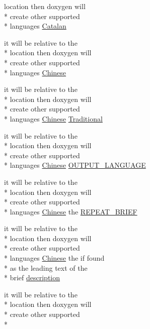 \begin{DoxyCompactItemize}
location then doxygen will \\*
create other supported \\*
languages \hyperlink{mkdoc_8dox_ab887b26d09c2ec0872c1e14e2f928a64}{Catalan}
\item 
it will be relative to the \\*
location then doxygen will \\*
create other supported \\*
languages \hyperlink{mkdoc_8dox_ab6ff97d2e5e9fa61c208d5f0eee91c62}{Chinese}
\item 
it will be relative to the \\*
location then doxygen will \\*
create other supported \\*
languages \hyperlink{mkdoc_8dox_ab6ff97d2e5e9fa61c208d5f0eee91c62}{Chinese} \hyperlink{mkdoc_8dox_ab1a4445cb897e49c113c5a2eff77118a}{Traditional}
\item 
it will be relative to the \\*
location then doxygen will \\*
create other supported \\*
languages \hyperlink{mkdoc_8dox_ab6ff97d2e5e9fa61c208d5f0eee91c62}{Chinese} \hyperlink{mkdoc_8dox_a70b2dc2bbbd06aad351734d9f602edd0}{O\-U\-T\-P\-U\-T\-\_\-\-L\-A\-N\-G\-U\-A\-G\-E}
\item 
it will be relative to the \\*
location then doxygen will \\*
create other supported \\*
languages \hyperlink{mkdoc_8dox_ab6ff97d2e5e9fa61c208d5f0eee91c62}{Chinese} the \hyperlink{mkdoc_8dox_a97488cf1b604b4e0594c9a044197735c}{R\-E\-P\-E\-A\-T\-\_\-\-B\-R\-I\-E\-F}
\item 
it will be relative to the \\*
location then doxygen will \\*
create other supported \\*
languages \hyperlink{mkdoc_8dox_ab6ff97d2e5e9fa61c208d5f0eee91c62}{Chinese} the if found \\*
as the leading text of the \\*
brief \hyperlink{mkdoc_8dox_ae82208d022e4246ddf1e4f481a3f81b0}{description}
\item 
it will be relative to the \\*
location then doxygen will \\*
create other supported \\*

\end{DoxyCompactItemize}
